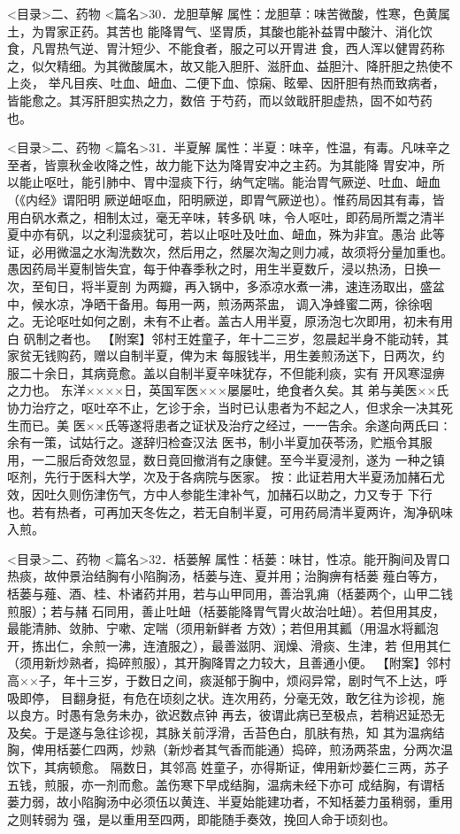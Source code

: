 \documentclass[a4paper,12pt,UTF8,twoside]{ctexbook}
\begin{document}
<目录>二、药物
<篇名>30．龙胆草解
属性：龙胆草∶味苦微酸，性寒，色黄属土，为胃家正药。其苦也 
能降胃气、坚胃质，其酸也能补益胃中酸汁、消化饮食，凡胃热气逆、胃汁短少、不能食者，服之可以开胃进 
食，西人浑以健胃药称之，似欠精细。为其微酸属木，故又能入胆肝、滋肝血、益胆汁、降肝胆之热使不上炎， 
举凡目疾、吐血、衄血、二便下血、惊痫、眩晕、因肝胆有热而致病者，皆能愈之。其泻肝胆实热之力，数倍 
于芍药，而以敛戢肝胆虚热，固不如芍药也。 

<目录>二、药物
<篇名>31．半夏解
属性：半夏∶味辛，性温，有毒。凡味辛之至者，皆禀秋金收降之性，故力能下达为降胃安冲之主药。为其能降 
胃安冲，所以能止呕吐，能引肺中、胃中湿痰下行，纳气定喘。能治胃气厥逆、吐血、衄血（《内经》谓阳明 
厥逆衄呕血，阳明厥逆，即胃气厥逆也）。惟药局因其有毒，皆用白矾水煮之，相制太过，毫无辛味，转多矾 
味，令人呕吐，即药局所鬻之清半夏中亦有矾，以之利湿痰犹可，若以止呕吐及吐血、衄血，殊为非宜。愚治 
此等证，必用微温之水淘洗数次，然后用之，然屡次淘之则力减，故须将分量加重也。 
愚因药局半夏制皆失宜，每于仲春季秋之时，用生半夏数斤，浸以热汤，日换一次，至旬日，将半夏剖 
为两瓣，再入锅中，多添凉水煮一沸，速连汤取出，盛盆中，候水凉，净晒干备用。每用一两，煎汤两茶盅， 
调入净蜂蜜二两，徐徐咽之。无论呕吐如何之剧，未有不止者。盖古人用半夏，原汤泡七次即用，初未有用白 
矾制之者也。 
【附案】邻村王姓童子，年十二三岁，忽晨起半身不能动转，其家贫无钱购药，赠以自制半夏，俾为末 
每服钱半，用生姜煎汤送下，日两次，约服二十余日，其病竟愈。盖以自制半夏辛味犹存，不但能利痰，实有 
开风寒湿痹之力也。 
东洋××××日，英国军医×××屡屡吐，绝食者久矣。其 
弟与美医××氏协力治疗之，呕吐卒不止，乞诊于余，当时已认患者为不起之人，但求余一决其死生而已。美 
医××氏等遂将患者之证状及治疗之经过，一一告余。余遂向两氏曰∶余有一策，试姑行之。遂辞归检查汉法 
医书，制小半夏加茯苓汤，贮瓶令其服用，一二服后奇效忽显，数日竟回撤消有之康健。至今半夏浸剂，遂为 
一种之镇呕剂，先行于医科大学，次及于各病院与医家。 
按∶此证若用大半夏汤加赭石尤效，因吐久则伤津伤气，方中人参能生津补气，加赭石以助之，力又专于 
下行也。若有热者，可再加天冬佐之，若无自制半夏，可用药局清半夏两许，淘净矾味入煎。 

<目录>二、药物
<篇名>32．栝蒌解
属性：栝蒌∶味甘，性凉。能开胸间及胃口热痰，故仲景治结胸有小陷胸汤，栝蒌与连、夏并用；治胸痹有栝蒌 
薤白等方，栝蒌与薤、酒、桂、朴诸药并用，若与山甲同用，善治乳痈（栝蒌两个，山甲二钱煎服）；若与赭 
石同用，善止吐衄（栝蒌能降胃气胃火故治吐衄）。若但用其皮，最能清肺、敛肺、宁嗽、定喘（须用新鲜者 
方效）；若但用其瓤（用温水将瓤泡开，拣出仁，余煎一沸，连渣服之），最善滋阴、润燥、滑痰、生津，若 
但用其仁（须用新炒熟者，捣碎煎服），其开胸降胃之力较大，且善通小便。 
【附案】邻村高××子，年十三岁，于数日之间，痰涎郁于胸中，烦闷异常，剧时气不上达，呼吸即停， 
目翻身挺，有危在顷刻之状。连次用药，分毫无效，敢乞往为诊视，施以良方。时愚有急务未办，欲迟数点钟 
再去，彼谓此病已至极点，若稍迟延恐无及矣。于是遂与急往诊视，其脉关前浮滑，舌苔色白，肌肤有热，知 
其为温病结胸，俾用栝蒌仁四两，炒熟（新炒者其气香而能通）捣碎，煎汤两茶盅，分两次温饮下，其病顿愈。 
隔数日，其邻高 
姓童子，亦得斯证，俾用新炒蒌仁三两，苏子五钱，煎服，亦一剂而愈。盖伤寒下早成结胸，温病未经下亦可 
成结胸，有谓栝蒌力弱，故小陷胸汤中必须伍以黄连、半夏始能建功者，不知栝蒌力虽稍弱，重用之则转弱为 
强，是以重用至四两，即能随手奏效，挽回人命于顷刻也。 
\end{document}
